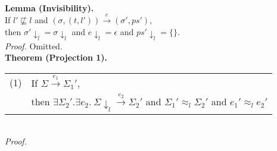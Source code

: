 \documentclass{article}
\newcommand{\tsteparrow}[1]{\overset{#1}{\longrightarrow}}
\newcommand{\tstep}[3]{#2\tsteparrow{#1}#3}
\newcommand{\ssteparrow}[1]{\overset{#1}{\longrightarrow}}
\newcommand{\sstep}[3]{#2\ssteparrow{#1}#3}
\newcommand{\process}[2]{(#1,#2)}
\newcommand{\proj}[2]{#1{\downarrow_{#2}}}
\newcommand{\lequiv}[3]{#2\approx_{#1}#3}
\begin{document}
\newpage
\noindent
%
%
\\
\textbf{Lemma (Invisibility).}
\\
If $l'\not\sqsubseteq l$
and $\tstep{e}{(\sigma,\process{t}{l'})}{(\sigma',ps')}$,
\\
then $\proj{\sigma'}{l}=\proj{\sigma}{l}$
and $\proj{e}{l}=\epsilon$
and $\proj{ps'}{l}=\{\}$.
\\
\textit{Proof.}
Omitted.
\\
\textbf{Theorem (Projection 1).}
\\
\begin{tabular}{l@{$\qquad$}l}
  (1) & If $\sstep{e_1}{\Sigma}{\Sigma_1'}$,
\\
      & then $\exists\Sigma_2'.\exists e_2.~\sstep{e_2}{\proj{\Sigma}{l}}{\Sigma_2'}$
        and $\lequiv{l}{\Sigma_1'}{\Sigma_2'}$
        and $\lequiv{l}{e_1'}{e_2'}$
\end{tabular}
\\
\textit{Proof.}
\\
\newcommand{\z}{$\quad$}
\end{document}
